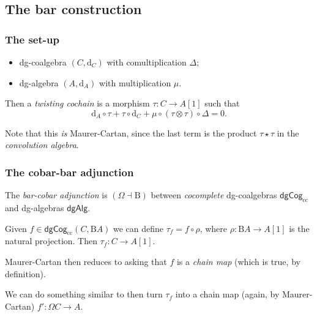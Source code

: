 \documentclass{beamer}
\begin{document}
    \subsection{The bar construction}

        \begin{frame}\frametitle{The set-up}
            \begin{itemize}
                \item dg-coalgebra $(C,\mathrm{d}_C)$ with comultiplication $\Delta$;
                \pause
                \item dg-algebra $(A,\mathrm{d}_A)$ with multiplication $\mu$.
            \end{itemize}

            \pause

            Then a \emph{twisting cochain} is a morphism $\tau\colon C\to A[1]$ such that
            \begin{equation*}
                \mathrm{d}_A\circ\tau + \tau\circ\mathrm{d}_C + \mu\circ(\tau\otimes\tau)\circ\Delta = 0.
            \end{equation*}

            \pause

            Note that this \emph{is} Maurer-Cartan, since the last term is the product $\tau\star\tau$ in the \emph{convolution algebra}.
        \end{frame}

        \begin{frame}\frametitle{The cobar-bar adjunction}
            The \emph{bar-cobar adjunction} is $(\Omega\dashv\mathrm{B})$ between  \emph{cocomplete} dg-coalgebras $\mathsf{dgCog}_{\mathrm{cc}}$ and dg-algebras $\mathsf{dgAlg}$.
            
            \pause

            Given $f\in\mathsf{dgCog}_{\mathrm{cc}}(C,\mathrm{B}A)$ we can define $\tau_f=f\circ\rho$, where $\rho\colon\mathrm{B}A\to A[1]$ is the natural projection.
            Then $\tau_f\colon C\to A[1]$.

            \pause

            Maurer-Cartan then reduces to asking that $f$ is a \emph{chain map} (which is true, by definition).

            \pause

            We can do something similar to then turn $\tau_f$ into a chain map (again, by Maurer-Cartan) $f'\colon\Omega C\to A$.
        \end{frame}
\end{document}

